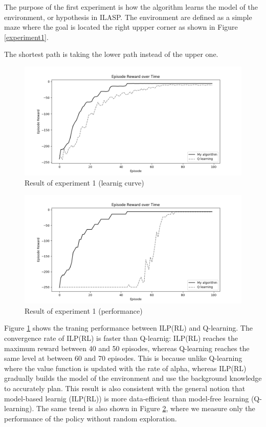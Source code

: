 The purpose of the first experiment is how the algorithm learns the model of the environment, or hypothesis in ILASP.
The environment are defined as a simple maze where the goal is located the right uppper corner as shown in Figure \ref{experiment1}.

The shortest path is taking the lower path instead of the upper one.

\begin{figure}[!htb]
\centering
\includegraphics[width=1.0\textwidth]{./figures/experiment1_training}
\caption{Result of experiment 1 (learnig curve)}
\label{experiment1_training}
\end{figure}
\begin{figure}[!htb]
\centering
\includegraphics[width=1.0\textwidth]{./figures/experiment1_test}
\caption{Result of experiment 1 (performance)}
\label{experiment1_test}
\end{figure}

Figure \ref{experiment1_training} shows the traning performance between ILP(RL) and Q-learning.
The convergence rate of ILP(RL) is faster than Q-learnig: ILP(RL) reaches the maximum reward between 40 and 50 episodes, whereas Q-learning reaches the same level at between 60 and 70 episodes.
This is because unlike Q-learning where the value function is updated with the rate of alpha, whereas ILP(RL) gradually builds the model of the environment and use the background knowledge to accurately plan.
This result is also consistent with the general notion that model-based learnig (ILP(RL)) is more data-efficient than model-free learning (Q-learning).
The same trend is also shown in Figure \ref{experiment1_test}, where we measure only the performance of the policy without random exploration.

